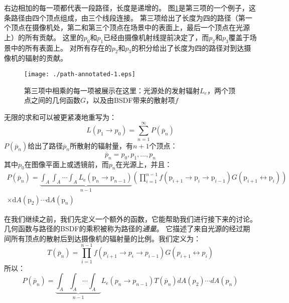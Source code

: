 \documentclass[a4paper]{article}
\begin{document}
	右边相加的每一项都代表一段路径，长度是递增的。
	图\ref{fig:path-annotated-1}是第三项的一个例子，这条路径由四个顶点组成，由三个线段连接。
	第三项给出了长度为四的路径（第一个顶点在摄像机处，第二和第三个顶点在场景中的表面上，最后一个顶点在光源上）的所有贡献。
	这里的$p_0$和$p_1$已经由摄像机射线提前决定了，而$p_2$和$p_3$覆盖于场景中的所有表面上。
	对所有存在的$p_2$和$p_3$的积分给出了长度为四的路径对到达摄像机的辐射的贡献。
	\begin{figure}[h!]
		\begin{framed}
		\texttt{[image: ./path-annotated-1.eps]}
		\caption{第三项中相乘的每一项被展示在这里：光源处的发射辐射$L_e$，两个顶点之间的几何函数$G$，以及由BSDF带来的散射项$f$}
		\label{fig:path-annotated-1}
		\end{framed}
	\end{figure}
	
	无限的求和可以被更紧凑地重写为：
	\begin{equation}
		L(p_1\rightarrow p_0)=\sum^\infty_{n=1}P(\overline{p}_n)
		\label{eq:compactly}
	\end{equation}
	$P(\overline{p}_n)$给出了路径$\overline{p}_n$所散射的辐射量，有$n+1$个顶点：
	\begin{equation*}
		\overline{p}_n=p_0,p_1,\ldots,p_n
	\end{equation*}
	其中$p_0$在图像平面上或透镜前，而$p_n$在光源上，并且：
	\begin{multline*}
	P\left(\overline{p}_{n}\right)=\underbrace{\int_{A} \int_{A} \cdots \int_{A} L_{\mathrm{e}}\left(\mathrm{p}_{n} \rightarrow \mathrm{p}_{n-1}\right)}_{n-1} \left(\prod_{i=1}^{n-1} f\left(\mathrm{p}_{i+1} \rightarrow \mathrm{p}_{i} \rightarrow \mathrm{p}_{i-1}\right) G\left(\mathrm{p}_{i+1} \leftrightarrow \mathrm{p}_{i}\right)\right) \\
	\times \mathrm{d} A\left(\mathrm{p}_{2}\right) \cdots \mathrm{d} A\left(\mathrm{p}_{n}\right)
	\end{multline*}

	在我们继续之前，我们先定义一个额外的函数，它能帮助我们进行接下来的讨论。
	几何函数与路径的BSDF的乘积被称为路径的\textit{通量}。
	它描述了来自光源的经过期间所有顶点的散射后到达摄像机的辐射量的比例。我们定义为：
	\begin{equation*}
		T(\overline{p}_n)=\prod^{n-1}_{i=1}f(p_{i+1}\rightarrow p_i \rightarrow p_{i-1})G(p_{i+1} \leftrightarrow p_i)
	\end{equation*}
	所以：
	\begin{equation*}
		P(\overline{p}_n)=\underbrace{\int_A\int_A\cdots\int_A}_{n-1}L_e(p_n\rightarrow p_{n-1})T(\overline{p}_n)dA(p_2)\cdots dA(p_n)
	\end{equation*}
\end{document}
